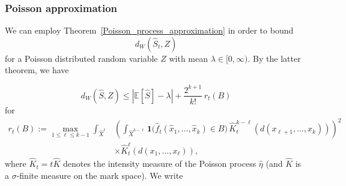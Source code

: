 \documentclass{article}
\theoremstyle{definition}
\numberwithin{equation}{section}
\theoremstyle{remark}
\begin{document}
\subsubsection{Poisson approximation}

We can employ Theorem~\ref{Poisson_process_approximation} %
in order to bound
$$d_W (\hat{S}_t,Z) $$
for a Poisson distributed random variable $Z$ with mean $\lambda\in[0,\infty)$. By the latter theorem, we have

\[
d_W(\hat{S}, Z) \leq \left| \mathbb{E}[\hat{S}] - \lambda \right| + \frac{2^{k+1}}{k!} \, r_t(B)
\]
for
\begin{align*}
    r_t(B) := \max_{1 \leq \ell \leq k-1} 
\int_{\hat{X}^\ell} & \left( 
\int_{\hat{X}^{k - \ell}} 
\mathbf{1}\big( \hat{f}_t ( \hat{x}_1, \ldots, \hat{x}_k ) \in B \big) \, 
\hat{K}_t^{k - \ell}(d(x_{\ell+1}, \ldots, x_k)) 
\right)^2 \\
& \times \hat{K}_t^\ell(d(x_1, \ldots, x_\ell)),
\end{align*}
where $\hat{K}_t = t \hat{K}$ denotes the intensity measure of the Poisson process $\hat{\eta}$ (and $\hat{K}$ is a $\sigma$-finite measure on the mark space). We write
\end{document}
